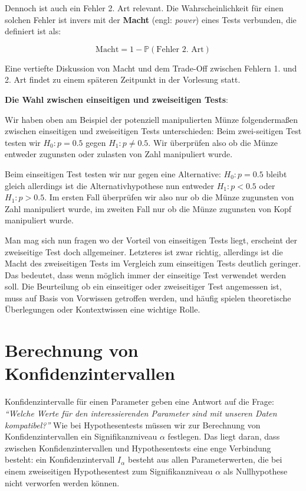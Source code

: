 \documentclass[]{book}
\begin{document}
Dennoch ist auch ein Fehler 2. Art relevant. Die Wahrscheinlichkeit für
einen solchen Fehler ist invers mit der \textbf{Macht} (engl:
\emph{power}) eines Tests verbunden, die definiert ist als:

\[\text{Macht}=1-\mathbb{P}(\text{Fehler 2. Art})\]

Eine vertiefte Diskussion von Macht und dem Trade-Off zwischen Fehlern
1. und 2. Art findet zu einem späteren Zeitpunkt in der Vorlesung statt.

\textbf{Die Wahl zwischen einseitigen und zweiseitigen Tests}:

Wir haben oben am Beispiel der potenziell manipulierten Münze
folgendermaßen zwischen einseitigen und zweiseitigen Tests
unterschieden: Beim zwei-seitigen Test testen wir \(H_0: p=0.5\) gegen
\(H_1: p\neq 0.5\). Wir überprüfen also ob die Münze entweder zugunsten
oder zulasten von Zahl manipuliert wurde.

Beim einseitigen Test testen wir nur gegen eine Alternative:
\(H_0: p=0.5\) bleibt gleich allerdings ist die Alternativhypothese nun
entweder \(H_1: p<0.5\) oder \(H_1: p>0.5\). Im ersten Fall überprüfen
wir also nur ob die Münze zugunsten von Zahl manipuliert wurde, im
zweiten Fall nur ob die Münze zugunsten von Kopf manipuliert wurde.

Man mag sich nun fragen wo der Vorteil von einseitigen Tests liegt,
erscheint der zweiseitige Test doch allgemeiner. Letzteres ist zwar
richtig, allerdings ist die Macht des zweiseitigen Tests im Vergleich
zum einseitigen Tests deutlich geringer. Das bedeutet, dass wenn möglich
immer der einseitige Test verwendet werden soll. Die Beurteilung ob ein
einseitiger oder zweiseitiger Test angemessen ist, muss auf Basis von
Vorwissen getroffen werden, und häufig spielen theoretische Überlegungen
oder Kontextwissen eine wichtige Rolle.

\section{Berechnung von
Konfidenzintervallen}\label{berechnung-von-konfidenzintervallen}

Konfidenzintervalle für einen Parameter geben eine Antwort auf die
Frage: \emph{``Welche Werte für den interessierenden Parameter sind mit
unseren Daten kompatibel?''} Wie bei Hypothesentests müssen wir zur
Berechnung von Konfidenzintervallen ein Signifikanzniveau \(\alpha\)
festlegen. Das liegt daran, dass zwischen Konfidenzintervallen und
Hypothesentests eine enge Verbindung besteht: ein Konfidenzintervall
\(I_{\alpha}\) besteht aus allen Parameterwerten, die bei einem
zweiseitigen Hypothesentest zum Signifikanzniveau \(\alpha\) als
Nullhypothese nicht verworfen werden können.
\end{document}
